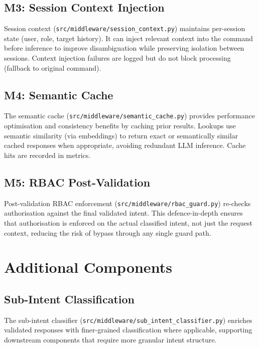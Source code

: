\subsection{M3: Session Context Injection}

Session context (\texttt{src/middleware/session\_context.py}) maintains per-session state (user, role, target history). It can inject relevant context into the command before inference to improve disambiguation while preserving isolation between sessions. Context injection failures are logged but do not block processing (fallback to original command).

\subsection{M4: Semantic Cache}

The semantic cache (\texttt{src/middleware/semantic\_cache.py}) provides performance optimisation and consistency benefits by caching prior results. Lookups use semantic similarity (via embeddings) to return exact or semantically similar cached responses when appropriate, avoiding redundant LLM inference. Cache hits are recorded in metrics.

\subsection{M5: RBAC Post-Validation}

Post-validation RBAC enforcement (\texttt{src/middleware/rbac\_guard.py}) re-checks authorisation against the final validated intent. This defence-in-depth ensures that authorisation is enforced on the actual classified intent, not just the request context, reducing the risk of bypass through any single guard path.

\section{Additional Components}\label{sec:method-additional}

\subsection{Sub-Intent Classification}

The sub-intent classifier (\texttt{src/middleware/sub\_intent\_classifier.py}) enriches validated responses with finer-grained classification where applicable, supporting downstream components that require more granular intent structure.

